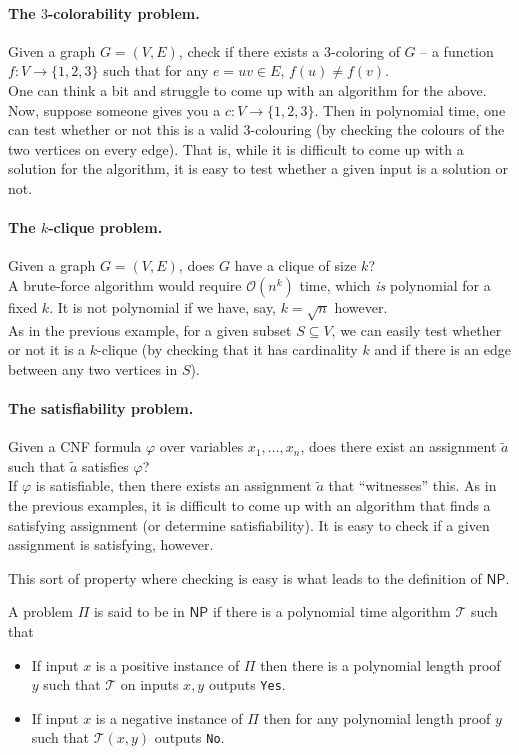 	\paragraph{The $3$-colorability problem.}
	Given a graph $G=(V,E)$, check if there exists a $3$-coloring of $G$ -- a function $f:V\to\{1,2,3\}$ such that for any $e=uv \in E$, $f(u) \neq f(v)$.\\
	One can think a bit and struggle to come up with an algorithm for the above. Now, suppose someone gives you a $c:V\to\{1,2,3\}$. Then in polynomial time, one can test whether or not this is a valid $3$-colouring (by checking the colours of the two vertices on every edge). That is, while it is difficult to come up with a solution for the algorithm, it is easy to test whether a given input is a solution or not.

	\paragraph{The $k$-clique problem.}
	Given a graph $G=(V,E)$, does $G$ have a clique of size $k$?\\
	A brute-force algorithm would require $\mathcal{O}(n^k)$ time, which \textit{is} polynomial for a fixed $k$. It is not polynomial if we have, say, $k=\sqrt{n}$ however.\\
	As in the previous example, for a given subset $S\subseteq V$, we can easily test whether or not it is a $k$-clique (by checking that it has cardinality $k$ and if there is an edge between any two vertices in $S$).

	\paragraph{The satisfiability problem.}
	Given a CNF formula $\varphi$ over variables $x_1,\ldots,x_n$, does there exist an assignment $\tilde{a}$ such that $\tilde{a}$ satisfies $\varphi$?\\
	If $\varphi$ is satisfiable, then there exists an assignment $\tilde{a}$ that ``witnesses'' this. As in the previous examples, it is difficult to come up with an algorithm that finds a satisfying assignment (or determine satisfiability). It is easy to check if a given assignment is satisfying, however.

	This sort of property where checking is easy is what leads to the definition of $\mathsf{NP}$.

	\begin{fdef}
		A problem $\mathsf{\Pi}$ is said to be in $\mathsf{NP}$ if there is a polynomial time algorithm $\mathcal{T}$ such that
		\begin{itemize}
			\item If input $x$ is a positive instance of $\Pi$ then there is a polynomial length proof $y$ such that $\mathcal{T}$ on inputs $x,y$ outputs \texttt{Yes}.
			\item If input $x$ is a negative instance of $\Pi$ then for any polynomial length proof $y$ such that $\mathcal{T}(x,y)$ outputs \texttt{No}.
		\end{itemize}
	\end{fdef}

